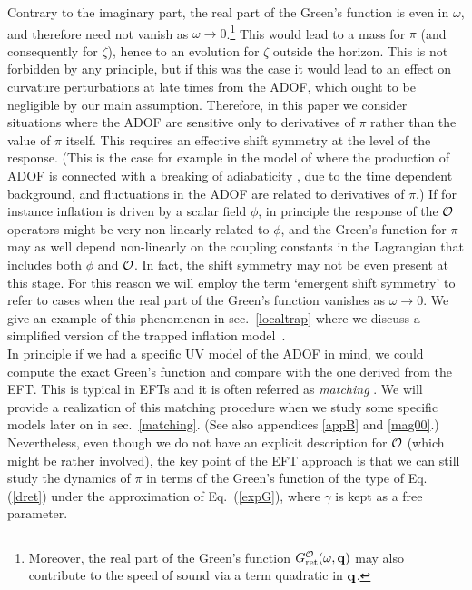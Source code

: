 \documentclass[11pt,amsmath,floats,floatfix,nofootinbib,secnumarabic, superscriptaddress, tightenlines]{revtex4}
\newcommand{\calo}{{\cal O}}
\begin{document}
Contrary to the imaginary part, the real part of the Green's function is even in $\omega$, and therefore need not vanish as $\omega \to 0$.\footnote{Moreover, the real part of the Green's function $G^\calo_{\rm ret}(\omega,{\bf q})$ may also contribute to the speed of sound via a term quadratic in ${\bf q}$.} This would lead to a mass for $\pi$ (and consequently for $\zeta$), hence to an evolution for $\zeta$ outside the horizon. This is not forbidden by any principle, but if this was the case it would lead to an effect on curvature perturbations at late times from the ADOF, which ought to be negligible by our main assumption. Therefore, in this paper we consider situations where the ADOF are sensitive only to derivatives of $\pi$ rather than the value of $\pi$ itself. This requires an effective shift symmetry at the level of the response. (This is the case for example in the model of \cite{trapped} where the production of ADOF is connected with a breaking of adiabaticity \cite{beauty}, due to the time dependent background, and fluctuations in the ADOF are related to derivatives of $\pi$.) If for instance inflation is driven by a scalar field $\phi$, in principle the response of the $\calo$ operators might be very non-linearly related to $\phi$, and the Green's function for $\pi$ may as well depend non-linearly on the coupling constants in the Lagrangian that includes both $\phi$ and $\calo$. In fact, the shift symmetry may not be even present at this stage. For this reason we will  employ the term `emergent shift symmetry' to refer to cases when the real part of the Green's function vanishes as $\omega\rightarrow 0$. We give an example of this phenomenon in sec.~\ref{localtrap} where we discuss a simplified version of the trapped inflation model~\cite{trapped}.\\

In principle if we had a specific UV model of the ADOF in mind, we could compute the exact Green's function and compare with the one derived from the EFT. This is typical in EFTs and it is often referred as {\it matching} \cite{iraeft}.  We will provide a realization of this matching procedure when we study some specific models later on in sec.~\ref{matching}. (See also appendices \ref{appB} and \ref{mag00}.) Nevertheless, even though we do not have an explicit description for $\calo$ (which might be rather involved), the key point of the EFT approach is that we can still study the dynamics of $\pi$ in terms of the Green's function of the type of Eq. (\ref{dret}) under the approximation of Eq.~(\ref{expG}), where $\gamma$ is kept as a free parameter.\\
\end{document}
